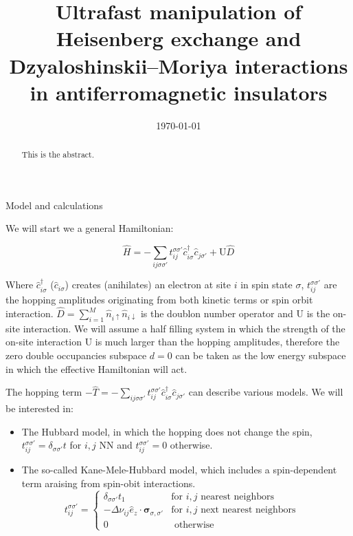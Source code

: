 \documentclass[aps,prl,twocolumn,amsmath,amssymb,superscriptaddress,nobibnotes]{revtex4}%
\newcommand{\n}{\nonumber}
\newcommand{\bs}{\boldsymbol}
\begin{document}
\title{Ultrafast manipulation of Heisenberg exchange and Dzyaloshinskii–Moriya interactions in antiferromagnetic insulators}


\begin{abstract}
This is the abstract.
\end{abstract}

\date{\today}
\maketitle

\begin{section}{Model and calculations}

We will start we a general Hamiltonian:

\begin{equation}
\hat{H} = -\sum_{ij\sigma \sigma'} t_{ij}^{\sigma \sigma'} \hat{c}_{i \sigma}^\dagger \hat{c}_{j \sigma'} + \text{U}\hat{D}
\end{equation}

Where $\hat{c}_{i \sigma}^\dagger$ ($ \hat{c}_{i \sigma}$) creates (anihilates) an electron at site $i$ in spin state $\sigma$, $t_{ij}^{\sigma \sigma'}$ are the hopping amplitudes originating from both kinetic terms or spin orbit interaction. $\hat{D} = \sum_{i=1}^M \hat{n}_{i\uparrow}\hat{n}_{i\downarrow}$ is the doublon number operator and $\text{U}$ is the on-site interaction. We will assume a half filling system in which the strength of the on-site interaction $\text{U}$ is much larger than the hopping amplitudes, therefore the zero double occupancies subspace $d=0$ can be taken as the low energy subspace in which the effective Hamiltonian will act.

The hopping term $-\hat{T} = -\sum_{ij\sigma \sigma'} t_{ij}^{\sigma \sigma'} \hat{c}_{i \sigma}^\dagger \hat{c}_{j \sigma'}$ can describe various models. We will be interested in:

\begin{itemize}
	\item The Hubbard model, in which the hopping does not change the spin, $t_{ij}^{\sigma \sigma'} = \delta_{\sigma \sigma'}t$ for $i,j$ NN and $t_{ij}^{\sigma \sigma'} = 0$ otherwise.
	\item The so-called Kane-Mele-Hubbard model, which includes a spin-dependent term araising from spin-obit interactions.
	\begin{equation}
t_{ij}^{\sigma \sigma'} = \begin{cases}
	\delta_{\sigma \sigma'}t_1 & \text{for } i, j \text{ nearest neighbors} \\
	-\Delta \nu_{ij} \hat{e}_z \cdot \bs{\sigma}_{\sigma, \sigma'} & \text{for } i, j \text{ next nearest neighbors} \\
	0 & \text{ otherwise} \n
\end{cases} \quad
\end{equation}
\end{itemize}


\end{section}
\end{document}
